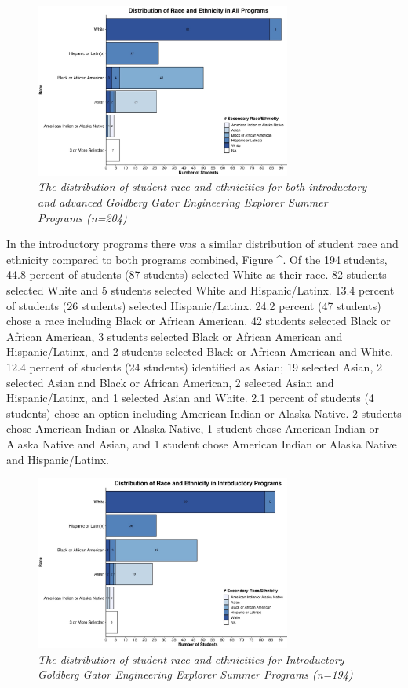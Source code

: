 \documentclass[
]{article}
\begin{document}
\begin{figure}
\centering
\includegraphics[width=0.75\textwidth,height=\textheight]{Graphs/Report/GGEE_23_Race_All_Num.jpg}
\caption{\emph{The distribution of student race and ethnicities for both
introductory and advanced Goldberg Gator Engineering Explorer Summer
Programs (n=204)}}
\end{figure}

In the introductory programs there was a similar distribution of student
race and ethnicity compared to both programs combined, Figure \^{}. Of
the 194 students, 44.8 percent of students (87 students) selected White
as their race. 82 students selected White and 5 students selected White
and Hispanic/Latinx. 13.4 percent of students (26 students) selected
Hispanic/Latinx. 24.2 percent (47 students) chose a race including Black
or African American. 42 students selected Black or African American, 3
students selected Black or African American and Hispanic/Latinx, and 2
students selected Black or African American and White. 12.4 percent of
students (24 students) identified as Asian; 19 selected Asian, 2
selected Asian and Black or African American, 2 selected Asian and
Hispanic/Latinx, and 1 selected Asian and White. 2.1 percent of students
(4 students) chose an option including American Indian or Alaska Native.
2 students chose American Indian or Alaska Native, 1 student chose
American Indian or Alaska Native and Asian, and 1 student chose American
Indian or Alaska Native and Hispanic/Latinx.

\begin{figure}
\centering
\includegraphics[width=0.75\textwidth,height=\textheight]{Graphs/Report/GGEE_23_Race_In_Num.jpg}
\caption{\emph{The distribution of student race and ethnicities for
Introductory Goldberg Gator Engineering Explorer Summer Programs
(n=194)}}
\end{figure}
\end{document}

